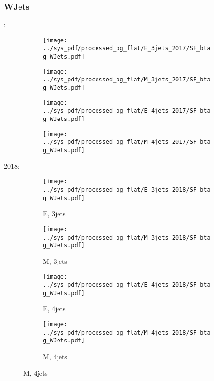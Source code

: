 \documentclass{beamer}
\begin{document}
\begin{frame}
\frametitle{WJets}
\fontsize{5}{1}:
\begin{figure}
\centering
\begin{subfigure}[b]{0.24\textwidth}
\texttt{[image: ../sys\_pdf/processed\_bg\_flat/E\_3jets\_2017/SF\_btag\_WJets.pdf]}
\end{subfigure}
\begin{subfigure}[b]{0.24\textwidth}
\texttt{[image: ../sys\_pdf/processed\_bg\_flat/M\_3jets\_2017/SF\_btag\_WJets.pdf]}
\end{subfigure}
\begin{subfigure}[b]{0.24\textwidth}
\texttt{[image: ../sys\_pdf/processed\_bg\_flat/E\_4jets\_2017/SF\_btag\_WJets.pdf]}
\end{subfigure}
\begin{subfigure}[b]{0.24\textwidth}
\texttt{[image: ../sys\_pdf/processed\_bg\_flat/M\_4jets\_2017/SF\_btag\_WJets.pdf]}
\end{subfigure}
\end{figure}
2018:
\begin{figure}
\centering
\begin{subfigure}[b]{0.24\textwidth}
\texttt{[image: ../sys\_pdf/processed\_bg\_flat/E\_3jets\_2018/SF\_btag\_WJets.pdf]}
\captionsetup{font=tiny}
\caption{E, 3jets}
\end{subfigure}
\begin{subfigure}[b]{0.24\textwidth}
\texttt{[image: ../sys\_pdf/processed\_bg\_flat/M\_3jets\_2018/SF\_btag\_WJets.pdf]}
\captionsetup{font=tiny}
\caption{M, 3jets}
\end{subfigure}
\begin{subfigure}[b]{0.24\textwidth}
\texttt{[image: ../sys\_pdf/processed\_bg\_flat/E\_4jets\_2018/SF\_btag\_WJets.pdf]}
\captionsetup{font=tiny}
\caption{E, 4jets}
\end{subfigure}
\begin{subfigure}[b]{0.24\textwidth}
\texttt{[image: ../sys\_pdf/processed\_bg\_flat/M\_4jets\_2018/SF\_btag\_WJets.pdf]}
\captionsetup{font=tiny}
\caption{M, 4jets}
\end{subfigure}
\end{figure}
\end{frame}
\end{document}
